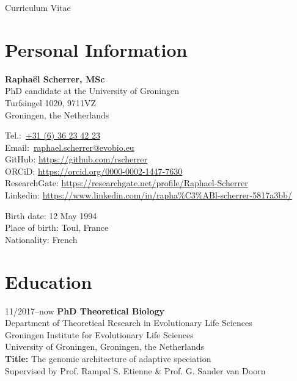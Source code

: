 \documentclass[11pt,a4paper]{article}
\newcommand\phone[1]{\href{tel:#1}{{\emailfont #1}}}
\newcommand\email[1]{\href{mailto:#1}{{\emailfont #1}}}
\newcommand\emailfont{\sffamily}
\newcommand{\CVAuthor}{\textbf{Rapha\"{e}l Scherrer, MSc}}
\begin{document}
	\begin{cv}{Curriculum Vitae}
		
		\section{Personal Information}
		
		\begin{cvlist}{}
			
			\item \CVAuthor\\
			PhD candidate at the University of Groningen\\
			Turfsingel 1020, 9711VZ\\
			Groningen, the Netherlands
			
			\item 
			Tel.:~\phone{+31 (6) 36 23 42 23}\\
			Email:~\email{raphael.scherrer@evobio.eu}\\
			GitHub: \url{https://github.com/rscherrer}\\
			ORCiD: \url{https://orcid.org/0000-0002-1447-7630}\\
			ResearchGate: \url{https://researchgate.net/profile/Raphael-Scherrer}\\
			Linkedin: \url{https://www.linkedin.com/in/rapha%C3%ABl-scherrer-5817a3bb/}
			
			\item 
			Birth date: 12 May 1994\\
			Place of birth: Toul, France\\
			Nationality: French
			
		\end{cvlist}
		
		\section{Education}
		
		\begin{cvlist}{}
			
			\item[11/2017--now] 
			\textbf{PhD Theoretical Biology}\\ 
			Department of Theoretical Research in Evolutionary Life Sciences\\
			Groningen Institute for Evolutionary Life Sciences\\
			University of Groningen, Groningen, the Netherlands\\
			\textbf{Title:} 
			The genomic architecture of adaptive speciation\\
			Supervised by Prof. Rampal S. Etienne \& Prof. G. Sander van Doorn
			

\end{cvlist}
\end{cv}
\end{document}
